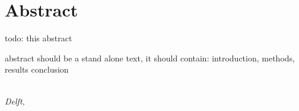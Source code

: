 \chapter*{Abstract}
todo: this abstract


abstract should be a stand alone text, it should contain: introduction, methods, results conclusion





\begin{flushright}
{\makeatletter\itshape
    \@author \\
    Delft, \monthname{} \the\year{}
\makeatother}
\end{flushright}
